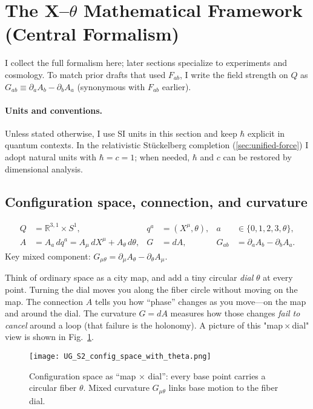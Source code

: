 \section{The X--\texorpdfstring{$\theta$}{theta} Mathematical Framework (Central Formalism)}\label{sec:framework}

I collect the full formalism here; later sections specialize to experiments and cosmology. To match prior drafts that used $F_{ab}$, I write the field strength on $Q$ as $G_{ab}\equiv\partial_aA_b-\partial_bA_a$ (synonymous with $F_{ab}$ earlier).

\paragraph{Units and conventions.} Unless stated otherwise, I use SI units in this section and keep $\hbar$ explicit in quantum contexts. In the relativistic St\"uckelberg completion (\cref{sec:unified-force}) I adopt natural units with $\hbar=c=1$; when needed, $\hbar$ and $c$ can be restored by dimensional analysis.

\subsection{Configuration space, connection, and curvature}\label{sec:config-connection-curvature}
\begin{align}
Q&=\mathbb{R}^{3,1}\times S^1, & q^a&=(X^\mu,\theta), & a&\in\{0,1,2,3,\theta\},\\
A&=A_a\,dq^a= A_\mu\,dX^\mu + A_\theta\,d\theta, & G&=dA, & G_{ab}&=\partial_aA_b-\partial_bA_a.
\end{align}
Key mixed component: $G_{\mu\theta}=\partial_\mu A_\theta-\partial_\theta A_\mu$.

\begin{idea}
Think of ordinary space as a city map, and add a tiny circular \emph{dial} $\theta$ at every point. Turning the dial moves you along the fiber circle without moving on the map. The connection $A$ tells you how “phase” changes as you move—on the map and around the dial. The curvature $G=dA$ measures how those changes \emph{fail to cancel} around a loop (that failure is the holonomy). A picture of this "map\,$\times$\,dial" view is shown in Fig.~\ref{fig:map-dial}.
\end{idea}

\begin{figure}[htbp]
  \centering
  \texttt{[image: UG\_S2\_config\_space\_with\_theta.png]}
  \caption{Configuration space as “map $\times$ dial”: every base point carries a circular fiber $\theta$. Mixed curvature $G_{\mu\theta}$ links base motion to the fiber dial.}
  \label{fig:map-dial}
\end{figure}


